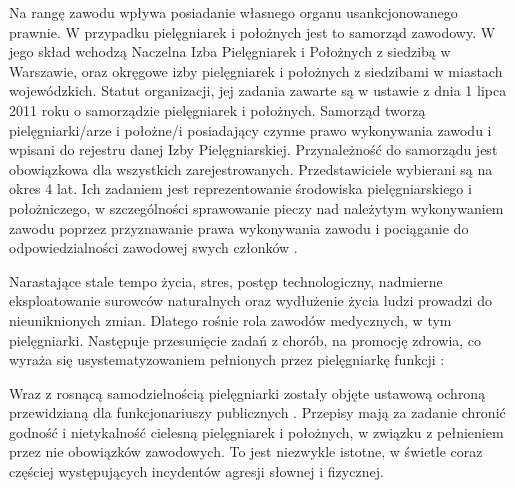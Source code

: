\documentclass[a4paper,12pt,twoside,openright]{mwrep}
\begin{document}
Na rangę zawodu wpływa posiadanie własnego organu usankcjonowanego prawnie. W przypadku pielęgniarek i położnych jest to samorząd zawodowy. W jego skład wchodzą Naczelna Izba Pielęgniarek i Położnych z siedzibą w Warszawie, oraz okręgowe izby pielęgniarek i położnych z siedzibami w miastach wojewódzkich. Statut organizacji, jej zadania zawarte są w ustawie z dnia 1 lipca 2011 roku o samorządzie pielęgniarek i położnych. Samorząd tworzą pielęgniarki/arze i położne/i posiadający czynne prawo wykonywania zawodu i wpisani do rejestru danej Izby Pielęgniarskiej. Przynależność do samorządu jest obowiązkowa dla wszystkich zarejestrowanych. Przedstawiciele wybierani są na okres 4 lat. Ich zadaniem jest reprezentowanie środowiska pielęgniarskiego i położniczego, w szczególności sprawowanie pieczy nad należytym wykonywaniem zawodu poprzez przyznawanie prawa wykonywania zawodu i pociąganie do odpowiedzialności zawodowej swych członków \cite{nipip}.

Narastające stale tempo życia, stres, postęp technologiczny, nadmierne eksploatowanie surowców naturalnych oraz wydłużenie życia ludzi prowadzi do nieuniknionych zmian. Dlatego rośnie rola zawodów medycznych, w tym pielęgniarki. Następuje przesunięcie zadań z chorób, na promocję zdrowia, co wyraża się usystematyzowaniem pełnionych przez pielęgniarkę funkcji :

Wraz z rosnącą samodzielnością pielęgniarki zostały objęte ustawową ochroną przewidzianą dla funkcjonariuszy publicznych \cite{prawo}. Przepisy mają za zadanie chronić godność i nietykalność cielesną pielęgniarek i położnych, w związku z pełnieniem przez nie obowiązków zawodowych. To jest niezwykle istotne, w świetle coraz częściej występujących incydentów agresji słownej i fizycznej.
\end{document}
